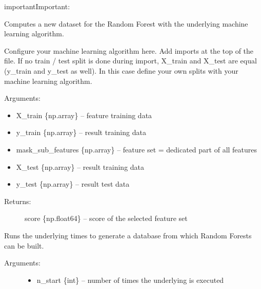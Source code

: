 \documentclass[letterpaper,10pt,english]{sphinxmanual}
\begin{document}
\begin{sphinxadmonition}{important}{Important:}

\begin{fulllineitems}
\label{\detokenize{Generate_Database:ForestFire.compute.compute}}
Computes a new dataset for the Random Forest with the underlying machine learning algorithm.

Configure your machine learning algorithm here.
Add imports at the top of the file.
If no train / test split is done during import, X\_train and X\_test are equal (y\_train and y\_test as well).
In this case define your own splits with your machine learning algorithm.

Arguments:
\begin{itemize}
\item {} 
X\_train \{np.array\} -- feature training data

\item {} 
y\_train \{np.array\} -- result training data

\item {} 
mask\_sub\_features \{np.array\} -- feature set = dedicated part of all features

\item {} 
X\_test \{np.array\} -- result training data

\item {} 
y\_test \{np.array\} -- result test data

\end{itemize}
\begin{description}
\item[{Returns:}] \leavevmode
score \{np.float64\} -- score of the selected feature set

\end{description}

\end{fulllineitems}


\begin{fulllineitems}
\label{\detokenize{Generate_Database:ForestFire.Main.gen_database}}
Runs the underlying {\hyperref[\detokenize{Overview:mla}]{}}  times to generate a database from which Random Forests can be built.
\begin{description}
\item[{Arguments:}] \leavevmode\begin{itemize}
\item {} 
n\_start \{int\} -- number of times the underlying {\hyperref[\detokenize{Overview:mla}]{}} is executed


\end{itemize}
\end{description}
\end{fulllineitems}
\end{sphinxadmonition}
\end{document}

